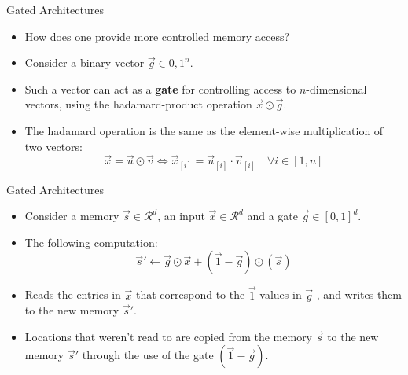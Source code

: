 \documentclass[handout]{beamer}
\begin{document}
\begin{frame}{Gated Architectures}
\begin{scriptsize}
\begin{itemize}
\item How does one provide more controlled memory access?
\item Consider a binary vector $\vec{g} \in {0,1}^n$. 
\item Such a vector can act as a \textbf{gate} for controlling access to $n$-dimensional vectors, using the hadamard-product operation $\vec{x} \odot \vec{g}$.
\item The hadamard operation is the same as the element-wise multiplication of two vectors:
\begin{displaymath}
\vec{x} = \vec{u} \odot \vec{v}  \Leftrightarrow  \vec{x}_{[i]} = \vec{u}_{[i]} \cdot \vec{v}_{[i]} \quad \forall i \in [1,n]
\end{displaymath}
\end{itemize}
\end{scriptsize}
\end{frame}




\begin{frame}{Gated Architectures}
\begin{scriptsize}
\begin{itemize}
\item Consider a memory $\vec{s} \in \mathcal{R}^{d}$, an input $\vec{x} \in \mathcal{R}^{d}$ and a gate $\vec{g} \in [0,1]^{d}$.
\item The following computation:
\begin{displaymath}
\vec{s}' \leftarrow \vec{g} \odot \vec{x} + (\vec{1}-\vec{g}) \odot (\vec{s}) 
\end{displaymath}
\item Reads the entries in $\vec{x}$ that correspond to the $\vec{1}$ values in $\vec{g}$ , and writes them to the new memory $\vec{s}'$.
\item Locations that weren't read to are copied from the memory $\vec{s}$ to the new memory $\vec{s}'$ through the use of the gate $(\vec{1}-\vec{g})$.
\end{itemize}
\end{scriptsize}
\end{frame}
\end{document}
